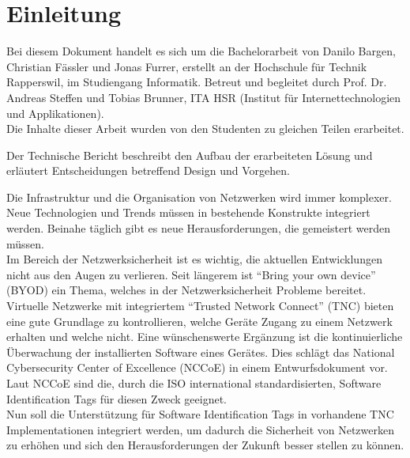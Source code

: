 \chapter{Einleitung}

Bei diesem Dokument handelt es sich um die Bachelorarbeit von Danilo Bargen,
Christian Fässler und Jonas Furrer, erstellt an der Hochschule für Technik Rapperswil, 
im Studiengang Informatik. Betreut und begleitet durch Prof. Dr.
Andreas Steffen und Tobias Brunner, ITA HSR (Institut für Internettechnologien
und Applikationen).\\
Die Inhalte dieser Arbeit wurden von den Studenten zu gleichen Teilen
erarbeitet.

Der Technische Bericht beschreibt den Aufbau der erarbeiteten Lösung und
erläutert Entscheidungen betreffend Design und Vorgehen.

Die Infrastruktur und die Organisation von Netzwerken wird immer komplexer. Neue
Technologien und Trends müssen in bestehende Konstrukte integriert werden.
Beinahe täglich gibt es neue Herausforderungen, die gemeistert werden müssen.\\
Im Bereich der Netzwerksicherheit ist es wichtig, die aktuellen Entwicklungen
nicht aus den Augen zu verlieren. Seit längerem ist \enquote{Bring your own
device} (BYOD) ein Thema, welches in der Netzwerksicherheit Probleme bereitet.
Virtuelle Netzwerke mit integriertem \enquote{Trusted Network Connect} (TNC)
bieten eine gute Grundlage zu kontrollieren, welche Geräte Zugang zu einem
Netzwerk erhalten und welche nicht. Eine wünschenswerte Ergänzung ist die
kontinuierliche Überwachung der installierten Software eines Gerätes. Dies
schlägt das National Cybersecurity Center of Excellence (NCCoE) in einem
Entwurfsdokument vor. Laut NCCoE sind die, durch die ISO international
standardisierten, Software Identification Tags für diesen Zweck geeignet.\\
Nun soll die Unterstützung für Software Identification Tags in vorhandene TNC
Implementationen integriert werden, um dadurch die Sicherheit von Netzwerken zu
erhöhen und sich den Herausforderungen der Zukunft besser stellen zu können.
